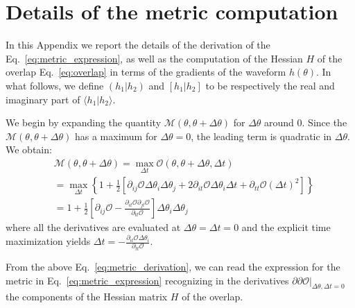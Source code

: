 \documentclass[twocolumn,showpacs,preprintnumbers,nofootinbib,prd,
superscriptaddress,10pt]{revtex4-2}
\newcommand{\scalar}[2]{\langle #1|#2 \rangle}
\newcommand{\rescalar}[2]{( #1|#2 )}
\newcommand{\imscalar}[2]{[ #1|#2 ]}
\begin{document}
\appendix

\section{Details of the metric computation}\label{app:metric}

In this Appendix we report the details of the derivation of the Eq.~\eqref{eq:metric_expression}, as well as the computation of the Hessian $H$ of the overlap Eq.~\eqref{eq:overlap} in terms of the gradients of the waveform $h(\theta)$. 
In what follows, we define $\rescalar{h_1}{h_2}$ and $\imscalar{h_1}{h_2}$ to be respectively the real and imaginary part of $\scalar{h_1}{h_2}$.

We begin by expanding the quantity $\mathcal{M}(\theta,\theta +\Delta\theta)$ for $\Delta\theta$ around $0$. Since the $\mathcal{M}(\theta,\theta +\Delta\theta)$ has a maximum for $\Delta\theta = 0$, the leading term is quadratic in $\Delta\theta$.
We obtain:
\begin{align} \label{eq:metric_derivation}
	&\mathcal{M}(\theta,\theta +\Delta\theta) = \max_{\Delta t} \mathcal{O}(\theta, \theta + \Delta\theta, \Delta t) \nonumber\\
	& =	\max_{\Delta t} \left\{ 1+ \frac{1}{2}\left[ \partial_{ij}\mathcal{O} \Delta\theta_i \Delta\theta_j + 2  \partial_{it}\mathcal{O} \Delta\theta_i \Delta t + \partial_{tt}\mathcal{O} (\Delta t)^2 \right] \right\}  \nonumber \\
	&= 1 + \frac{1}{2}\left[ \partial_{ij}\mathcal{O} - \frac{\partial_{it}\mathcal{O} \partial_{jt}\mathcal{O}}{\partial_{tt}\mathcal{O}}\right] \Delta\theta_i \Delta\theta_j
\end{align}
where all the derivatives are evaluated at ${\Delta\theta = \Delta t = 0}$ and the explicit time maximization yields
${\Delta t = -\frac{\partial_{it}\mathcal{O} \Delta\theta_i}{\partial_{tt}\mathcal{O}}}$.

From the above Eq.~\eqref{eq:metric_derivation}, we can read the expression for the metric in Eq.~\eqref{eq:metric_expression} recognizing in the derivatives $\partial\partial\mathcal{O}|_{\Delta\theta, \Delta t = 0}$ the components of the Hessian matrix $H$ of the overlap.
\end{document}
